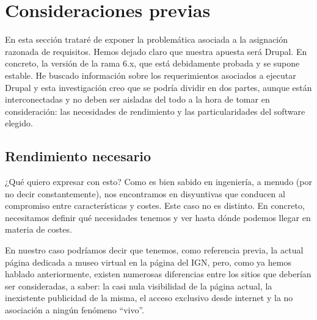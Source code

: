 \section{Consideraciones previas}
\label{cha:rendimiento}
\par En esta sección trataré de exponer la problemática asociada a la asignación razonada de requisitos.
Hemos dejado claro que nuestra apuesta será Drupal. En concreto, la versión de la rama 6.x, que está debidamente probada y se supone estable.
He buscado información sobre los requerimientos asociados a ejecutar Drupal y esta investigación creo que se podría dividir en dos partes, aunque están interconectadas y no deben ser aisladas del todo a la hora de tomar en consideración: las necesidades de rendimiento y las particularidades del software elegido.
\subsection{Rendimiento necesario}
\par ¿Qué quiero expresar con esto? Como es bien sabido en ingeniería, a menudo (por no decir constantemente), nos encontramos en disyuntivas que conducen al compromiso entre características y costes. Este caso no es distinto. En concreto, necesitamos definir qué necesidades tenemos y ver hasta dónde podemos llegar en materia de costes. 
\par En nuestro caso podríamos decir que tenemos, como referencia previa, la actual página dedicada a museo virtual en la página del IGN\cite{references:museovirtualoan}, pero, como ya hemos hablado anteriormente, existen numerosas diferencias entre los sitios que deberían ser consideradas, a saber: la casi nula visibilidad de la página actual, la inexistente publicidad de la misma, el acceso exclusivo desde internet y la no asociación a ningún fenómeno ``vivo''. 

